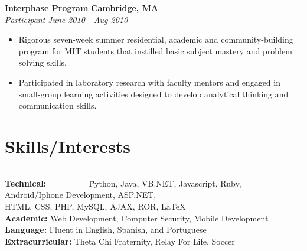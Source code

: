 \documentclass{res}
\begin{document}
\begin{resume}
 {\bf Interphase Program} \hfill {\bf Cambridge, MA} \\
{\textit {Participant}} \hfill {\textit {June 2010 - Aug 2010 }}
 \begin{itemize} 
\renewcommand{\labelitemi}{\ding{117}}
\itemsep -2pt  %
 \item	Rigorous seven-week summer residential, academic and community-building program for MIT students that instilled basic subject mastery and problem solving skills.
 \item Participated in laboratory research with faculty mentors and engaged in small-group learning activities designed to develop analytical thinking and communication skills.
 \end{itemize}

\vspace{-9pt}
\section{{\large Skills/Interests}}

\vspace{-10pt}

\noindent\rule{\resumewidth}{0.4pt}   %
\vspace{-30pt}
\begin{tabbing}
 {\bf Technical: } ~~~~~~~~~ \= Python, Java, VB.NET, Javascript, Ruby, Android/Iphone Development, ASP.NET, \\
\> HTML, CSS, PHP, MySQL, AJAX, ROR, \LaTeX \\
{\bf Academic: } \>  Web Development, Computer Security, Mobile Development \\
{\bf Language: } \> Fluent in English, Spanish, and Portuguese\\
{\bf Extracurricular: } \> Theta Chi Fraternity, Relay For Life, Soccer \\
\end{tabbing}

\end{resume} 
\end{document}
